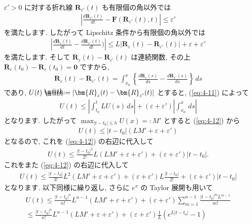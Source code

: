 \documentclass[openany, a4paper, oneside]{jsbook}
\makeatletter
\newcommand*{\defeq}{\mathrel{\rlap{%
\raisebox{0.3ex}{$\m@th\cdot$}}%
\raisebox{-0.3ex}{$\m@th\cdot$}}%
=}
\theoremstyle{break}
\theoremstyle{breakdefn}
\newcommand{\abs}[1]{\left|#1\right|}
\newcommand{\vep}{\varepsilon}
\makeatother
\begin{document}
$\vep ' >0$ に対する折れ線 $\bm{R}_{\vep '}(t)$ も有限個の角以外では
\begin{gather}
\left | \frac{ d \bm{R}_{\vep '} ( t ) } {dt} - \bm{F} ( \bm{R}_{\vep '} (t) , t )  \right|
\leq
\vep '
\label{eq:4-10}
\end{gather}
を満たします.
したがって Lipschitz 条件から有限個の角以外では
\begin{gather}
\left | \frac{d \bm{R}_{ \vep } (t) } {dt} - \frac{d \bm{R}_{ \vep '} (t) } {dt} ) \right|
\leq
L | \bm{R}_{\vep} (t) - \bm{R}_{\vep '} (t) | + \vep + \vep '
\label{eq:4-11}
\end{gather}
を満たします.
そして $\bm{R}_{\vep} (t) - \bm{R}_{\vep '} (t)$ は連続関数,
その上 $\bm{R}_{\vep} (t_0) - \bm{R}_{\vep} (t_0) = \bm{0}$ ですから,
\begin{gather}
\bm{R}_{\vep} (t) - \bm{R}_{\vep '} (t)
=
\int_{x_0}^x \left \{   \frac{d \bm{R}_{ \vep } (s) } {ds} - \frac{d \bm{R}_{ \vep '} (s) } {ds} \right \} \, ds
\end{gather}
であり, $U (t) \defeq | \bm{R}_{\vep} (t) - \bm{R}_{\vep '} (t) |$ とすると, (\ref{eq:4-11}) によって
\begin{gather}
 U (t)
 \leq
 \left| \int_{t_0}^t L U (s) \, ds \right|
 +( \vep + \vep ' ) \left| \int_{x_0}^x \, ds \right|
\label{eq:4-12}
\end{gather}
となります.
したがって $\max_{ | t - t_0 | \leq h } U (x) =: M'$ とすると (\ref{eq:4-12}) から
\begin{gather}
 U (t)
 \leq
 \abs{t - t_0}( LM' + \vep + \vep ' )
\end{gather}
となるので, これを (\ref{eq:4-12}) の右辺に代入して
\begin{gather}
 U (t)
 \leq
 \frac{ | t - t_0 |^2 } {2!} L ( LM' + \vep + \vep ' ) + ( \vep + \vep ' )| t - t_0 |.
\end{gather}
これをまた (\ref{eq:4-12}) の右辺に代入して
\begin{gather}
 U (t)
 \leq
 \frac{| t - t_0 |} {3!} L^2 ( LM' + \vep + \vep ' )
 +( \vep + \vep ' ) L \frac{| t - t_0 |} {2!}
 +( \vep + \vep ' ) | t - t_0 |
\end{gather}
となります.
以下同様に繰り返し, さらに $e^x$ の Taylor 展開も用いて
\begin{gather}
 U (t)
 \leq
 \frac{| t - t_0 |^n} {n!}L^{n-1} ( LM' + \vep + \vep ' )
 +( \vep + \vep ' ) \sum_{m=1}^{n-1} \frac{ | t - t_0 |^m L^{m-1} } {m!} \\
 \leq
 \frac{| t - t_0 |^n} {n!}L^{n-1} ( LM' + \vep + \vep ' )
 +( \vep + \vep ' ) \frac{1} {L} \left ( e^{ L | t - t_0 | } - 1 \right)
\end{gather}
\end{document}
